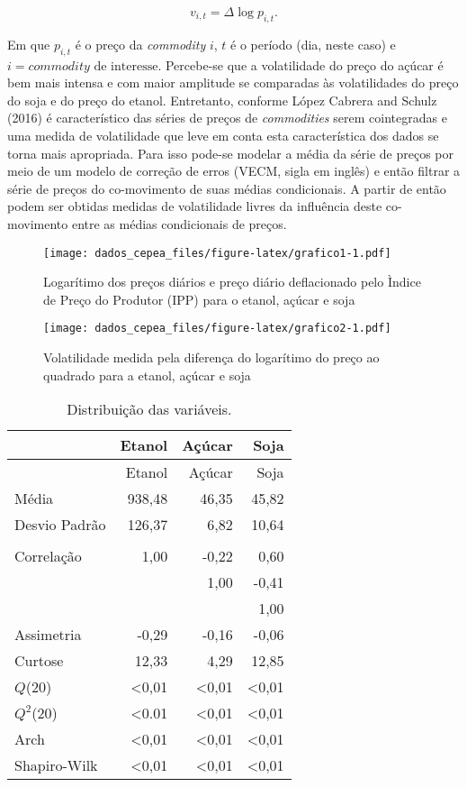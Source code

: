 \documentclass[]{article}
\begin{document}
\begin{equation}
v_{i,t} =\Delta \log p_{i,t}.
\end{equation}

Em que \(p_{i,t}\) é o preço da \emph{commodity} \(i\), \(t\) é o
período (dia, neste caso) e \(i = commodity \text{ de interesse}\).
Percebe-se que a volatilidade do preço do açúcar é bem mais intensa e
com maior amplitude se comparadas às volatilidades do preço do soja e do
preço do etanol. Entretanto, conforme López Cabrera and Schulz (2016) é
característico das séries de preços de \emph{commodities} serem
cointegradas e uma medida de volatilidade que leve em conta esta
característica dos dados se torna mais apropriada. Para isso pode-se
modelar a média da série de preços por meio de um modelo de correção de
erros (VECM, sigla em inglês) e então filtrar a série de preços do
co-movimento de suas médias condicionais. A partir de então podem ser
obtidas medidas de volatilidade livres da influência deste co-movimento
entre as médias condicionais de preços.

\begin{figure}[htbp]
\centering
\texttt{[image: dados\_cepea\_files/figure-latex/grafico1-1.pdf]}
\caption{Logarítimo dos preços diários e preço diário deflacionado pelo
Ìndice de Preço do Produtor (IPP) para o etanol, açúcar e soja}
\end{figure}

\begin{figure}[htbp]
\centering
\texttt{[image: dados\_cepea\_files/figure-latex/grafico2-1.pdf]}
\caption{Volatilidade medida pela diferença do logarítimo do preço ao
quadrado para a etanol, açúcar e soja}
\end{figure}

\pagebreak

\begin{longtable}[]{@{}lrrr@{}}
\caption{Distribuição das variáveis.}\tabularnewline
\toprule
& Etanol & Açúcar & Soja\tabularnewline
\midrule
\endfirsthead
\toprule
& Etanol & Açúcar & Soja\tabularnewline
\midrule
\endhead
Média & 938,48 & 46,35 & 45,82\tabularnewline
Desvio Padrão & 126,37 & 6,82 & 10,64\tabularnewline
& & &\tabularnewline
Correlação & 1,00 & -0,22 & 0,60\tabularnewline
& & 1,00 & -0,41\tabularnewline
& & & 1,00\tabularnewline
Assimetria & -0,29 & -0,16 & -0,06\tabularnewline
Curtose & 12,33 & 4,29 & 12,85\tabularnewline
\(Q\)(20) & \textless{}0,01 & \textless{}0,01 &
\textless{}0,01\tabularnewline
\(Q^2\)(20) & \textless{}0.01 & \textless{}0,01 &
\textless{}0,01\tabularnewline
Arch & \textless{}0,01 & \textless{}0,01 &
\textless{}0,01\tabularnewline
Shapiro-Wilk & \textless{}0,01 & \textless{}0,01 &
\textless{}0,01\tabularnewline
\bottomrule
\end{longtable}
\end{document}

